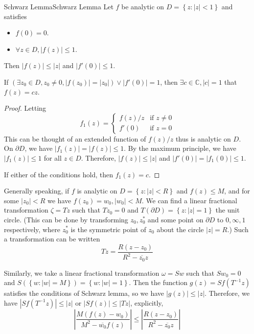 \documentclass[../main.tex]{subfiles}
\begin{document}
\begin{theorem}{Schwarz Lemma}{Schwarz Lemma}
	Let $f$ be analytic on $D=\left\{ z: \left|z\right|<1 \right\}$ and satisfies
	\begin{itemize}
	\item $f(0)=0$.
	\item $\forall z\in D, \left|f(z)\right| \leq 1$.
	\end{itemize}
	Then $\left|f(z)\right|\leq \left|z\right|$ and $\left|f'(0)\right|\leq 1$.

	If $(\exists z_0\in D,z_0\neq 0,\left|f(z_0)\right|=\left|z_0\right|) \lor \left|f'(0)\right|=1$, then $\exists c\in \mathbb{C},\left|c\right|=1$ that $f(z) = cz$.
\end{theorem}
\begin{proof}
Letting
\begin{equation*}
	f_1(z) = 
	\begin{cases}
		f(z) / z & \text{if } z\neq 0\\
		f'(0) & \text{if } z=0
	\end{cases}
\end{equation*}
This can be thought of an extended function of $f(z) / z$ thus is analytic on $D$. On $\partial D$, we have $\left|f_1(z)\right| = \left|f(z)\right| \leq 1$. By the maximum principle, we have $\left|f_1(z)\right|\leq 1$ for all $z\in D$. Therefore, $\left|f(z)\right| \leq \left|z\right|$ and $\left|f'(0)\right| = \left|f_1(0)\right|\leq 1$.

If either of the conditions hold, then $f_1(z)=c$.
\end{proof}

Generally speaking, if $f$ is analytic on $D= \left\{ z: \left|z\right|<R \right\}$ and $f(z) \leq M$, and for some $\left|z_0\right|<R$ we have $f(z_0)=w_0, \left|w_0\right|<M$. We can find a linear fractional transformation $\zeta=Tz$ such that $Tz_0=0$ and $T(\partial D) = \left\{ z: \left|z\right|=1 \right\}$ the unit circle. (This can be done by transforming $z_0,z_0^*$ and some point on $\partial D$ to $0,\infty,1$ respectively, where $z_0^*$ is the symmetric point of $z_0$ about the circle $\left|z\right|=R$.) Such a transformation can be written 
\begin{equation*}
	Tz = \frac{R(z-z_0)}{R^2-\overline{z_0}z}
\end{equation*}

Similarly, we take a linear fractional transformation $\omega = Sw$ such that $Sw_0=0$ and $S(\left\{ w: \left|w\right|=M \right\}) = \left\{ w: \left|w\right|=1 \right\}$. Then the function $g(z) = Sf(T^{-1}z)$ satisfies the conditions of Schwarz lemma, so we have $\left|g(z)\right|\leq \left|z\right|$. Therefore, we have $\left|Sf(T^{-1}z)\right| \leq \left|z\right|$ or $\left|Sf(z)\right| \leq \left|Tz\right|$, explicitly,
\begin{equation}
	\left|\frac{M(f(z)-w_0)}{M^2-\overline{w_0}f(z)}\right| \leq \left|\frac{R(z-z_0)}{R^2-\overline{z_0}z}\right|
\end{equation}
\end{document}
